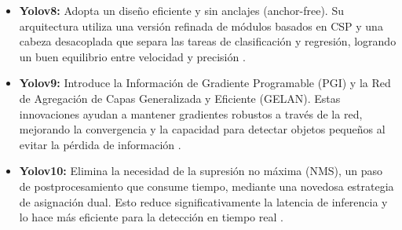 \documentclass[12pt,a4paper,onecolumn,oneside]{report}
\begin{document}
\begin{itemize}
  \item \textbf{Yolov8:} Adopta un diseño eficiente y sin anclajes (anchor-free). Su arquitectura utiliza una versión refinada de módulos basados en CSP y una cabeza desacoplada que separa las tareas de clasificación y regresión, logrando un buen equilibrio entre velocidad y precisión \cite{defyolos}.
  \item \textbf{Yolov9:} Introduce la Información de Gradiente Programable (PGI) y la Red de Agregación de Capas Generalizada y Eficiente (GELAN). Estas innovaciones ayudan a mantener gradientes robustos a través de la red, mejorando la convergencia y la capacidad para detectar objetos pequeños al evitar la pérdida de información \cite{defyolos}.
  \item \textbf{Yolov10:} Elimina la necesidad de la supresión no máxima (NMS), un paso de postprocesamiento que consume tiempo, mediante una novedosa estrategia de asignación dual. Esto reduce significativamente la latencia de inferencia y lo hace más eficiente para la detección en tiempo real \cite{defyolos}.
\end{itemize}
\end{document}
